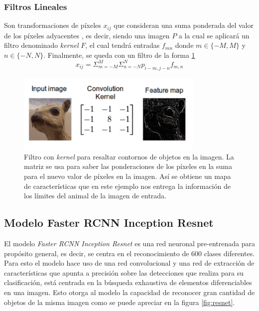 \documentclass[letter,12pt]{report}
\begin{document}
\subsubsection{Filtros Lineales}
Son transformaciones de píxeles $x_{ij}$ que consideran una suma ponderada del valor de
los píxeles adyacentes \cite{Conv}, es decir, siendo una imagen $P$ a la cual se  aplicará
un filtro denominado \textit{kernel} $F$, el cual tendrá entradas $f_{mn}$ donde
$m\in\{-M,M\}$ y $n\in\{-N,N\}$. Finalmente, se queda con un filtro de la forma
\ref{fig:kernel}
$$x_{ij}=\Sigma_{m=-M}^M\Sigma_{n=-N}^Np_{i-m,j-n}f_{m,n}$$

\begin{figure}[H]
    \centering
    \includegraphics[width=0.8\textwidth]{kernel}
    \caption{Filtro con \textit{kernel} para resaltar contornos de objetos en la imagen.
        La matriz se usa para saber las ponderaciones de los píxeles en la suma para el nuevo
        valor de píxeles en la imagen. Así se obtiene un mapa de características que en este
    ejemplo nos entrega la información de los límites del animal de la imagen de entrada.}
    \label{fig:kernel}
\end{figure}

\subsection{Modelo Faster RCNN Inception Resnet}

El modelo \textit{Faster RCNN Inception Resnet} \cite{tensorflowmodelgarden2020} es una red
neuronal pre-entrenada para propósito general, es decir, se centra en el reconocimiento de
$600$ clases diferentes. Para esto el modelo hace uso de una red convolucional y una
red de extracción de características que apunta a precisión sobre las detecciones que realiza
para su clasificación, está centrada en la búsqueda exhaustiva de elementos diferenciables en
una imagen. Esto otorga al modelo la capacidad de reconocer gran cantidad de objetos de la
misma imagen como se puede apreciar en la figura \ref{fig:resnet}.
\end{document}

